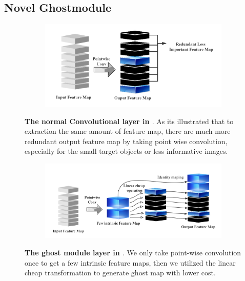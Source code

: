 \subsection{Novel Ghostmodule} %
\label{sub:amet}

\begin{figure}[h]
	\begin{center}
		\begin{subfigure}[b]{\textwidth}
		    \centering
			\includegraphics[width=\textwidth]{thesis-template-master/images/normal conv.png}
			
			\label{fig:cellnet}
		\end{subfigure}
	\end{center}
	\caption{\textbf{The normal Convolutional layer in \cite{b26}\cite{b27}\cite{b28}}. As its illustrated that to extraction the same amount of feature map, there are much more redundant output feature map by taking point wise convolution, especially for the small target objects or less informative images.}
\end{figure}


\begin{figure}[h]
	\begin{center}
		
		\begin{subfigure}[b]{\textwidth}
		    \centering
			\includegraphics[width=\textwidth]{thesis-template-master/images/ghostmodule.png}
			
			\label{fig:cellnet}
		\end{subfigure}
	\end{center}
	\caption{\textbf{The ghost module layer in \cite{b19}}. We only take point-wise convolution once to get a few intrinsic feature maps, then we utilized the linear cheap transformation to generate ghost map with lower cost.}
\end{figure}

